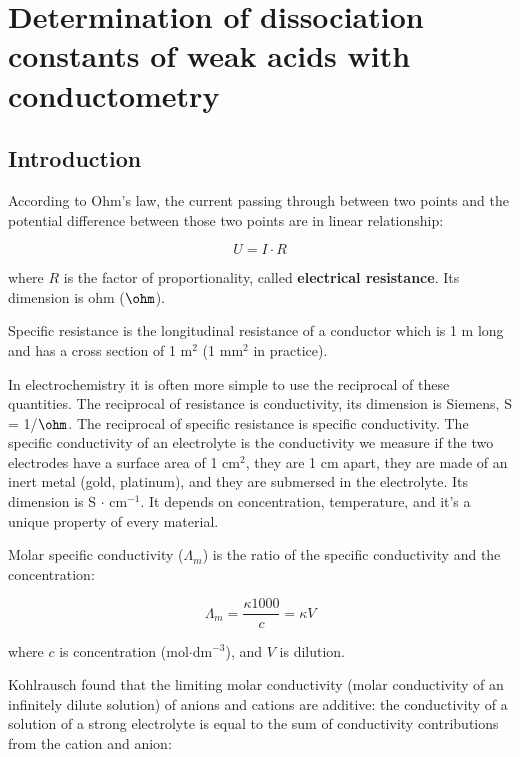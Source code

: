 \fancyhead[LO,RE]{\thesection}
\fancyfoot[LE,RO]{\thepage}

\setcounter{section}{1}
\section{Determination of dissociation constants of weak acids with conductometry}
\subsection{Introduction}
According to Ohm's law, the current passing through between two points and the potential difference between those two points are in linear relationship:

\begin{equation}
\label{eq:ohm}
	U
	=
	I
	\cdot
	R
\end{equation}

where $R$ is the factor of proportionality, called \textbf{electrical resistance}. Its dimension is ohm ($\ohm$).

Specific resistance is the longitudinal resistance of a conductor which is 1 m long and has a cross section of 1 m$^2$ (1 mm$^2$ in practice). 

In electrochemistry it is often more simple to use the reciprocal of these quantities. The reciprocal of resistance is conductivity, its dimension is Siemens, S = 1/$\ohm$. The reciprocal of specific resistance is specific conductivity. The specific conductivity of an electrolyte is the conductivity we measure if the two electrodes have a surface area of 1 cm$^2$, they are 1 cm apart, they are made of an inert metal (gold, platinum), and they are submersed in the electrolyte. Its dimension is S $\cdot$ cm$^{-1}$. It depends on concentration, temperature, and it's a unique property of every material.

Molar specific conductivity ($\Lambda _m$) is the ratio of the specific conductivity and the concentration:

\begin{equation}
\label{eq:lambdam}
        \Lambda_m
        =
        \frac
		{\kappa 1000 }
		{c}
	=
	\kappa V
\end{equation}

where $c$ is concentration (mol$\cdot$dm$^{-3}$), and $V$ is dilution.

Kohlrausch found that the limiting molar conductivity (molar conductivity of an infinitely dilute solution) of anions and cations are additive: the conductivity of a solution of a strong electrolyte is equal to the sum of conductivity contributions from the cation and anion:

